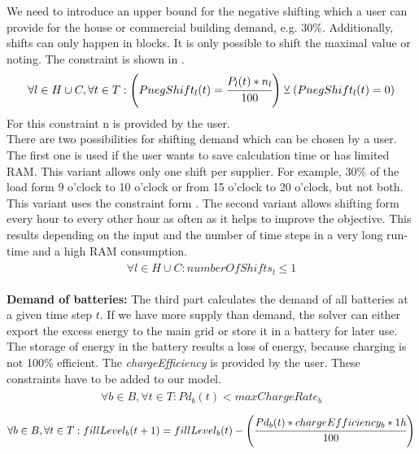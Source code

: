 We need to introduce an upper bound for the negative shifting which a user can provide for the house or commercial building demand, e.g. 30\%. Additionally, shifts can only happen in blocks. It is only possible to shift the maximal value or noting. 
The constraint  is shown in .
\begin{align} \label{eq:shiftingUpperBound}
\begin{split}
\forall l \in H\cup C, \forall t \in T: \left(PnegShift_l(t) = \cfrac{P_{l}(t) * n_{l}}{100}\right) \veebar (PnegShift_{l}(t) = 0)
\end{split}
\end{align}
For this constraint n is provided by the user.\\
There are two possibilities for shifting demand which can be chosen by a user. The first one is used if the user wants to save calculation time or has limited RAM. This variant allows only one shift per supplier. For example, 30\% of the load form 9 o'clock to 10 o'clock or from 15 o'clock to 20 o'clock, but not both. This variant uses the constraint form . The second variant allows shifting form every hour to every other hour as often as it helps to improve the objective. This results depending on the input and the number of time steps in a very long run-time and a high RAM consumption.
\begin{align} \label{eq:numberOfShifts}
\begin{split}
\forall l \in H\cup C: numberOfShifts_{l} \leq 1
\end{split}
\end{align}

\textbf{Demand of batteries:}
The third part calculates the demand of all batteries at a given time step $t$.
If we have more supply than demand, the solver can either export the excess energy to the main grid or store it in a battery for later use.
The storage of energy in the battery results a loss of energy, because charging is not 100\% efficient. The \textit{chargeEfficiency} is provided by the user. These constraints have to be added to our model.
\begin{align} \label{eq:limitCharge}
\begin{split}
\forall b \in B, \forall t \in T: Pd_{b}(t) < maxChargeRate_{b}
\end{split}
\end{align}
\begin{align} \label{eq:effi}
\begin{split}
\forall b \in B, \forall t \in T: fillLevel_{b}(t+1) = fillLevel_{b}(t) - \left( \cfrac{Pd_{b}(t)*chargeEfficiency_b * 1h}{100}\right)
\end{split}
\end{align}

